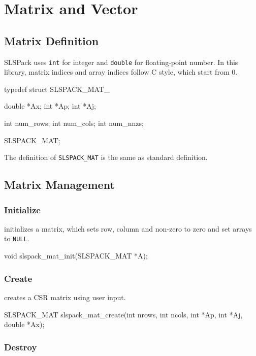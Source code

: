 
\chapter{Matrix and Vector}

\section{Matrix Definition}

SLSPack uses \verb|int| for integer and \verb|double| for floating-point number.
In this library, matrix indices and array indices follow C style, which start from 0.

\begin{evb}
typedef struct SLSPACK_MAT_
{
    double *Ax;
    int *Ap;
    int *Aj;

    int num_rows;
    int num_cols;
    int num_nnzs;

} SLSPACK_MAT;
\end{evb}

The definition of \verb|SLSPACK_MAT| is the same as standard definition.

\section{Matrix Management}

\subsection{Initialize}

 initializes a matrix, which sets row, column and non-zero to zero and 
set arrays to \verb|NULL|.

\begin{evb}
void slspack_mat_init(SLSPACK_MAT *A);
\end{evb}

\subsection{Create}
 creates a CSR matrix using user input.
\begin{evb}
SLSPACK_MAT slspack_mat_create(int nrows, int ncols, int *Ap, int *Aj, double *Ax);
\end{evb}

\subsection{Destroy}

